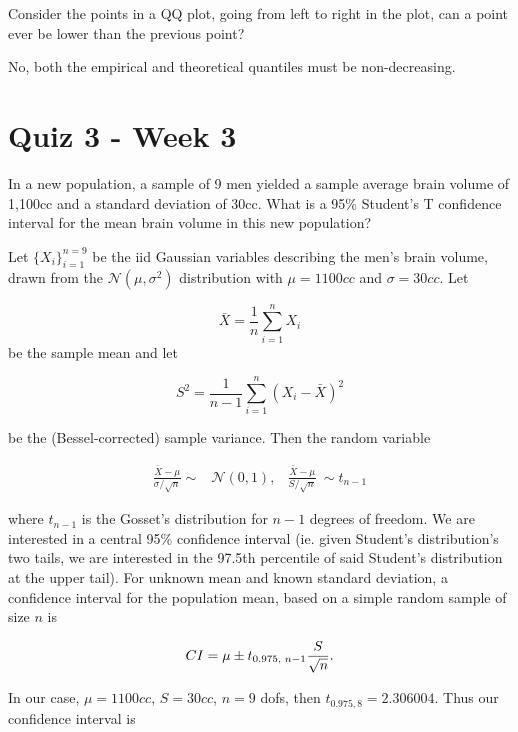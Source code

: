 \documentclass{homework}
\begin{document}
\begin{tcolorbox}[title=Question 10]
Consider the points in a QQ plot, going from left to right in the plot, can a point ever be lower than the previous point?
\end{tcolorbox} 

No, both the empirical and theoretical quantiles must be non-decreasing. 

\clearpage

\section{Quiz 3 - Week 3}

\begin{tcolorbox}[title=Question 1]
In a new population, a sample of 9 men yielded a sample average brain volume of 1,100cc and a standard deviation of 30cc. What is a 95\% Student's T confidence interval for the mean brain volume in this new population?
\end{tcolorbox}

Let $\{X_i\}_{i=1}^{n=9}$ be the iid Gaussian variables describing the men's brain volume, drawn from the $\mathcal{N}(\mu, \sigma^2)$ distribution with $\mu = 1100cc$ and $\sigma = 30cc$. Let 

$$
\bar X = \frac{1}{n}\sum_{i=1}^{n} X_i
$$
be the sample mean and let

$${\displaystyle S^{2}={\frac {1}{n-1}}\sum _{i=1}^{n}(X_{i}-{\bar {X}})^{2}}$$

be the (Bessel-corrected) sample variance. Then the random variable

\begin{align*}
{\frac {{\bar {X}}-\mu }{\sigma /{\sqrt {n}}}} \sim & {\mathcal{N}(0,1)}, & \frac{\bar X - \mu}{S / \sqrt{n}}\ \sim t_{n-1}    
\end{align*}

where $t_{n-1}$ is the Gosset's distribution for $n-1$ degrees of freedom. We are interested in a central 95\% confidence interval (ie. given Student's distribution's two tails, we are interested in the 97.5th percentile of said Student's distribution at the upper tail). For unknown mean and known standard deviation, a confidence interval for the population mean, based on a simple random sample of size $n$ is 

$$
CI = \mu \pm t_{\textnormal{0.975, } n-1}\frac{S}{\sqrt{n}}.
$$

In our case, $\mu = 1100cc$, $S=30cc$, $n=9$ dofs, then $t_{0.975, 8} = 2.306004$. Thus our confidence interval is 
\end{document}
